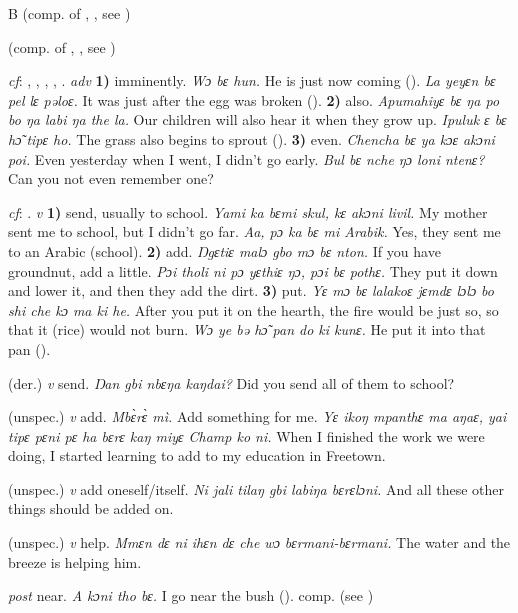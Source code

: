 \begin{letter}{B}
 (comp. of , , see ) 

 (comp. of , , see ) 

 \textit{cf}: , , , , . \textit{adv} \textbf{1)} imminently. \textit{Wɔ bɛ hun.} He is just now coming (\citealt{Pichl1967}). \textit{La yeyɛn bɛ pel lɛ pəloɛ.} It was just after the egg was broken (\citealt{Pichl1967}). \textbf{2)} also. \textit{Apumahiyɛ bɛ ŋa po bo ŋa labi ŋa the la.} Our children will also hear it when they grow up. \textit{Ipuluk ɛ bɛ hɔ̃ tipɛ ho.} The grass also begins to sprout (\citealt{Pichl1967}). \textbf{3)} even. \textit{Chencha bɛ ya kɔɛ akɔni poi.} Even yesterday when I went, I didn't go early. \textit{Bul bɛ nche ŋɔ loni ntenɛ?} Can you not even remember one?

 \textit{cf}: . \textit{v} \textbf{1)} send, usually to school. \textit{Yami ka bɛmi skul, kɛ akɔni livil.} My mother sent me to school, but I didn't go far. \textit{Aa, pɔ ka bɛ mi Arabik.} Yes, they sent me to an Arabic (school). \textbf{2)} add. \textit{Ŋgɛtiɛ malɔ gbo mɔ bɛ nton.} If you have groundnut, add a little. \textit{Pɔi tholi ni pɔ yɛthiɛ ŋɔ, pɔi bɛ pothɛ.} They put it down and lower it, and then they add the dirt. \textbf{3)} put. \textit{Yɛ mɔ bɛ lalakoɛ jɛmdɛ lɔlɔ bo shi che kɔ ma ki he.} After you put it on the hearth, the fire would be just so, so that it (rice) would not burn. \textit{Wɔ ye bə hɔ̃ pan do ki kunɛ.} He put it into that pan (\citealt{Pichl1967}). 

 (der.) \textit{v} send. \textit{Ŋan gbi nbɛŋa kaŋdai?} Did you send all of them to school?

 (unspec.) \textit{v} add. \textit{Mbɛ̀rɛ̀ mì.} Add something for me. \textit{Yɛ ikoŋ mpanthɛ ma aŋaɛ, yai tipɛ pɛni pɛ ha bɛrɛ kaŋ miyɛ Champ ko ni.} When I finished the work we were doing, I started learning to add to my education in Freetown.

 (unspec.) \textit{v} add oneself/itself. \textit{Ni jali tilaŋ gbi labiŋa bɛrɛlɔni.} And all these other things should be added on.

 (unspec.) \textit{v} help. \textit{Mmɛn dɛ ni ihɛn dɛ che wɔ bɛrmani-bɛrmani.} The water and the breeze is helping him. 

 \textit{post} near. \textit{A kɔni tho bɛ.} I go near the bush (\citealt{Pichl1967}). comp.  (see ) 


\end{letter}
